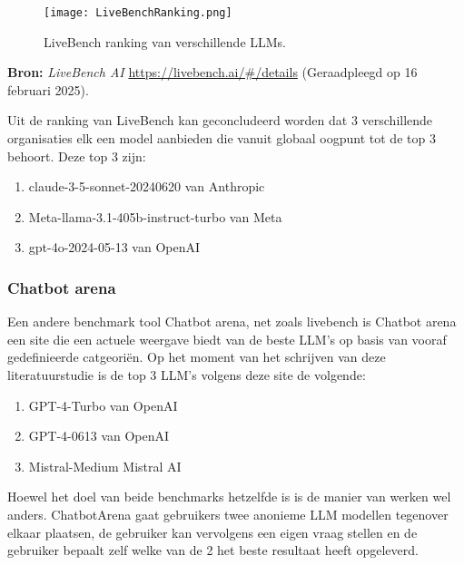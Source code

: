         \begin{figure}[H]
            \centering
            \texttt{[image: LiveBenchRanking.png]}
            \caption{LiveBench ranking van verschillende LLMs.}
            \label{fig:livebench}
        \end{figure}
        
        \noindent\textbf{Bron:} \textit{LiveBench AI} \url{https://livebench.ai/#/details} (Geraadpleegd op 16 februari 2025).
        
        Uit de ranking van LiveBench kan geconcludeerd worden dat 3 verschillende organisaties elk een model aanbieden die vanuit globaal oogpunt tot de top 3 behoort. Deze top 3 zijn: 
        \begin{enumerate}
            \item claude-3-5-sonnet-20240620 van Anthropic
            \item Meta-llama-3.1-405b-instruct-turbo van Meta
            \item gpt-4o-2024-05-13 van OpenAI
        \end{enumerate}
        
        \subsubsection{Chatbot arena} 
        
        Een andere benchmark tool Chatbot arena, net zoals livebench is Chatbot arena een site die een actuele weergave biedt van de beste LLM's op basis van vooraf gedefinieerde catgeoriën. Op het moment van het schrijven van deze literatuurstudie is de top 3 LLM's volgens deze site de volgende:
        
        \begin{enumerate}
            \item GPT-4-Turbo van OpenAI
            \item GPT-4-0613 van OpenAI
            \item Mistral-Medium Mistral AI
        \end{enumerate}
        
        Hoewel het doel van beide benchmarks hetzelfde is is de manier van werken wel anders. ChatbotArena gaat gebruikers twee anonieme LLM modellen tegenover elkaar plaatsen, de gebruiker kan vervolgens een eigen vraag stellen en de gebruiker bepaalt zelf welke van de 2 het beste resultaat heeft opgeleverd.
        
